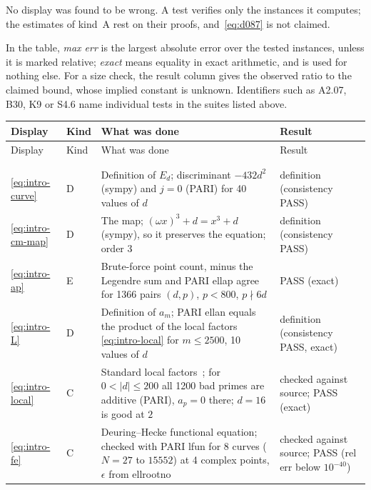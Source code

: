 \documentclass[11pt]{article}
\numberwithin{equation}{section}
\begin{document}
No display was found to be wrong. A test verifies only the instances it computes; the estimates of kind~A
rest on their proofs, and~\eqref{eq:d087} is not claimed.

In the table, \emph{max err} is the largest absolute error over the tested instances, unless it is marked relative;
\emph{exact} means equality in exact arithmetic, and is used for nothing else. For a size check, the result column gives the observed ratio to the
claimed bound, whose implied constant is unknown. Identifiers such as A2.07, B30, K9 or S4.6 name individual tests in
the suites listed above.

\clearpage
\begingroup
\footnotesize
\setlength{\tabcolsep}{3pt}
\begin{longtable}{@{}>{\raggedright\arraybackslash}p{1.2cm}>{\centering\arraybackslash}p{0.7cm}>{\raggedright\arraybackslash}p{9.05cm}>{\raggedright\arraybackslash}p{4.3cm}@{}}
\toprule
Display & Kind & What was done & Result\\\midrule
\endfirsthead
\toprule
Display & Kind & What was done & Result\\\midrule
\endhead
\midrule
\multicolumn{4}{r@{}}{\emph{continued on the next page}}\\
\endfoot
\bottomrule
\endlastfoot
\multicolumn{4}{@{}l}{\emph{Introduction}}\\
\eqref{eq:intro-curve} & D & Definition of $E_d$; discriminant $-432d^2$ (sympy) and $j=0$ (PARI) for 40 values of $d$ & definition (consistency PASS)\\
\eqref{eq:intro-cm-map} & D & The map; $(\omega x)^3+d=x^3+d$ (sympy), so it preserves the equation; order 3 & definition (consistency PASS)\\
\eqref{eq:intro-ap} & E & Brute-force point count, minus the Legendre sum and PARI ellap agree for 1366 pairs $(d,p)$, $p<800$, $p\nmid6d$ & PASS (exact)\\
\eqref{eq:intro-L} & D & Definition of $a_m$; PARI ellan equals the product of the local factors \eqref{eq:intro-local} for $m\le2500$, 10 values of $d$ & definition (consistency PASS, exact)\\
\eqref{eq:intro-local} & C & Standard local factors~\cite[Appendix~C, \S16]{SilAEC}; for $0<|d|\le200$ all 1200 bad primes are additive (PARI), $a_p=0$ there; $d=16$ is good at $2$ & checked against source; PASS (exact)\\
\eqref{eq:intro-fe} & C & Deuring--Hecke functional equation; checked with PARI lfun for 8 curves ($N=27$ to $15552$) at 4 complex points, $\epsilon$ from ellrootno & checked against source; PASS (rel err below $10^{-40}$)\\

\end{longtable}
\end{document}
